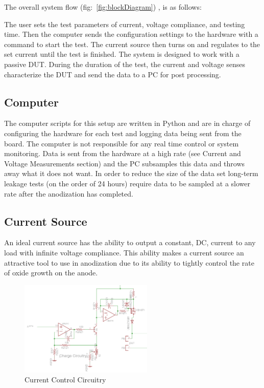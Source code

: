 \documentclass[journal]{IEEEtran}
\begin{document}
The overall system flow (fig:~\ref{fig:blockDiagram}) , is as follows:

The user sets the test parameters of current, voltage compliance, and testing time. Then the computer sends the configuration settings to the hardware with a command to start the test. The current source then turns on and regulates to the set current until the test is finished. The system is designed to work with a passive DUT. During the duration of the test, the current and voltage senses characterize the DUT and send the data to a PC for post processing.

\subsection{Computer}

The computer scripts for this setup are written in Python and are in charge of configuring the hardware for each test and logging data being sent from the board. The computer is not responsible for any real time control or system monitoring. Data is sent from the hardware at a high rate (see Current and Voltage Measurements section) and the PC subsamples this data and throws away what it does not want. In order to reduce the size of the data set long-term leakage tests (on the order of 24 hours) require data to be sampled at a slower rate after the anodization has completed.


\subsection{Current Source}

An ideal current source has the ability to output a constant, DC, current to any load with infinite voltage compliance. This ability makes a current source an attractive tool to use in anodization due to its ability to tightly control the rate of oxide growth on the anode.

\begin{figure}[here]
\centering
\includegraphics[width=2.5in]{currentMirror}
\caption{Current Control Circuitry}
\label{fig:currentMirror}
\end{figure}
\end{document}
